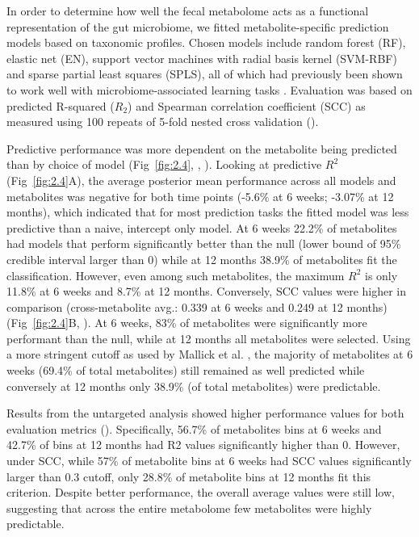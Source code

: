 In order to determine how well the fecal metabolome acts as a functional representation of the gut microbiome, we fitted metabolite-specific prediction models based on taxonomic profiles. Chosen models include random forest (RF), elastic net (EN), support vector machines with radial basis kernel (SVM-RBF) and sparse partial least squares (SPLS), all of which had previously been shown to work well with microbiome-associated learning tasks \cite{zhou2019review}. Evaluation was based on predicted R-squared ($R_2$) and Spearman correlation coefficient (SCC) as measured using 100 repeats of 5-fold nested cross validation (). 

Predictive performance was more dependent on the metabolite being predicted than by choice of model (Fig~\ref{fig:2.4}, , ). Looking at predictive $R^2$ (Fig~\ref{fig:2.4}A), the average posterior mean performance across all models and metabolites was negative for both time points (-5.6\% at 6 weeks; -3.07\% at 12 months), which indicated that for most prediction tasks the fitted model was less predictive than a naive, intercept only model. At 6 weeks 22.2\% of metabolites had models that perform significantly better than the null (lower bound of 95\% credible interval larger than 0) while at 12 months 38.9\% of metabolites fit the classification. However, even among such metabolites, the maximum $R^2$ is only 11.8\% at 6 weeks and 8.7\% at 12 months. Conversely, SCC values were higher in comparison (cross-metabolite avg.: 0.339 at 6 weeks and 0.249 at 12 months) (Fig~\ref{fig:2.4}B, ). At 6 weeks, 83\% of metabolites were significantly more performant than the null, while at 12 months all metabolites were selected. Using a more stringent cutoff as used by Mallick et al. \cite{mallick2019predictive}, the majority of metabolites at 6 weeks (69.4\% of total metabolites) still remained as well predicted while conversely at 12 months only 38.9\% (of total metabolites) were predictable. 

Results from the untargeted analysis showed higher performance values for both evaluation metrics (). Specifically, 56.7\% of metabolites bins at 6 weeks and 42.7\% of bins at 12 months had R2 values significantly higher than 0. However, under SCC, while 57\% of metabolite bins at 6 weeks had SCC values significantly larger than 0.3 cutoff, only 28.8\% of metabolite bins at 12 months fit this criterion. Despite better performance, the overall average values were still low, suggesting that across the entire metabolome few metabolites were highly predictable.  

